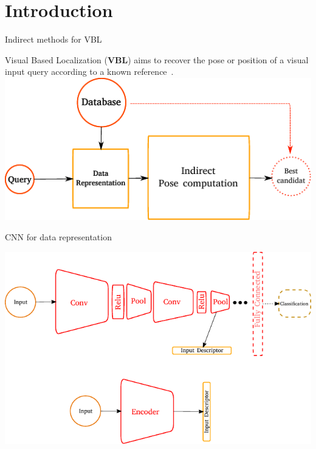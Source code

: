 \section{Introduction}

\label{sec:intro}

\begin{frame}{Indirect methods for VBL}
	
	Visual Based Localization (\textbf{VBL}) aims to recover the pose or position of a visual input query according to a known reference~\cite{Piasco2017}.
	\vfill	
	\includegraphics{vect/keys_comp_indirect.pdf}
	
\end{frame}

\begin{frame}{CNN for data representation}
	
	\vfill	
	\includegraphics{vect/encodeur.pdf}
	\vfill	
		
\end{frame}


